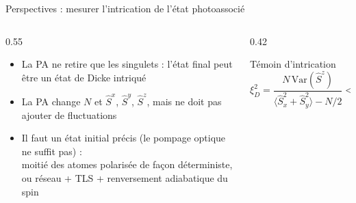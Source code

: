 \documentclass[aspectratio=169, 11pt]{beamer}
\begin{document}
\begin{frame}{Perspectives : mesurer l'intrication de l'état photoassocié}
  \begin{columns}[c]
    \begin{column}{0.55\textwidth}
      \begin{itemize}
        \item<1-> La PA ne retire que les singulets :
          l'état final peut être un \alert{état de Dicke} intriqué
        \item<2-> La PA change $N$ et $\hat S^{x}$, $\hat S^{y}$, $\hat S^{z}$,
          mais ne doit pas ajouter de fluctuations
        \item<3-> Il faut un \alert{état initial précis}
          (le pompage optique ne suffit pas) :\\
          {\small moitié des atomes polarisée de façon déterministe,
          ou réseau + TLS + renversement adiabatique du spin}
      \end{itemize}
    \end{column}
    \begin{column}{0.42\textwidth}
      \begin{block}{Témoin d'intrication}
        \centering
        $\xi_D^2 = \dfrac{N\,\mathrm{Var}(\hat S^z)}{\langle \hat S_x^2 + \hat S_y^2\rangle - N/2} < 1$
      \end{block}
    \end{column}
  \end{columns}
\end{frame}
\end{document}
